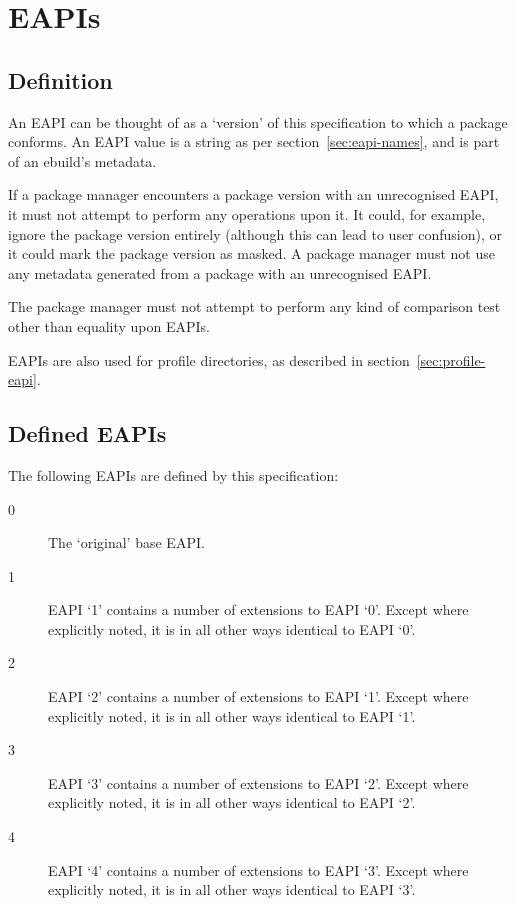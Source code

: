 \chapter{EAPIs}

\section{Definition}

An EAPI can be thought of as a `version' of this specification to which a package conforms. An EAPI
value is a string as per section~\ref{sec:eapi-names}, and is part of an ebuild's metadata.

If a package manager encounters a package version with an unrecognised EAPI, it must not attempt to
perform any operations upon it. It could, for example, ignore the package version entirely (although
this can lead to user confusion), or it could mark the package version as masked. A package manager
must not use any metadata generated from a package with an unrecognised EAPI.

The package manager must not attempt to perform any kind of comparison test other than equality upon
EAPIs.

EAPIs are also used for profile directories, as described in section~\ref{sec:profile-eapi}.

\section{Defined EAPIs}

The following EAPIs are defined by this specification:

\begin{description}
\item[0] The `original' base EAPI.
\item[1] EAPI `1' contains a number of extensions to EAPI `0'. Except where explicitly noted, it is
    in all other ways identical to EAPI `0'.
\item[2] EAPI `2' contains a number of extensions to EAPI `1'. Except where explicitly noted, it is
    in all other ways identical to EAPI `1'.
\item[3] EAPI `3' contains a number of extensions to EAPI `2'. Except where explicitly noted, it is
    in all other ways identical to EAPI `2'.
\item[4] EAPI `4' contains a number of extensions to EAPI `3'. Except where explicitly noted, it is
    in all other ways identical to EAPI `3'.
\end{description}

